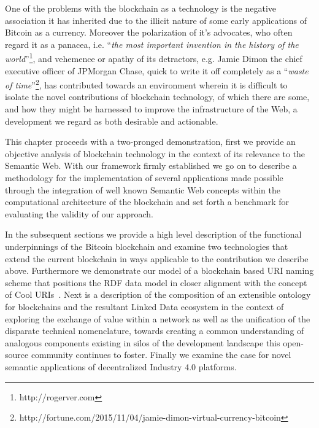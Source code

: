 One of the problems with the blockchain as a technology is the negative association it has inherited due to the illicit nature of some early applications of Bitcoin as a currency. Moreover the polarization of it's advocates, who often regard it as a panacea, i.e. ``\textit{the most important invention in the history of the world}''\footnote{\footnotesize{http://rogerver.com}}, and vehemence or apathy of its detractors, e.g. Jamie Dimon the chief executive officer of JPMorgan Chase, quick to write it off completely as a ``\textit{waste of time}''\footnote{\footnotesize{http://fortune.com/2015/11/04/jamie-dimon-virtual-currency-bitcoin}}, has contributed towards an environment wherein it is difficult to isolate the novel contributions of blockchain technology, of which there are some, and how they might be harnessed to improve the infrastructure of the Web, a development we regard as both desirable and actionable. 

This chapter proceeds with a two-pronged demonstration, first we provide an objective analysis of blockchain technology in the context of its relevance to the Semantic Web.
With our framework firmly established we go on to describe a methodology for the implementation of several applications made possible through the integration of well known Semantic Web concepts within the computational architecture of the blockchain and set forth a benchmark for evaluating the validity of our approach.

In the subsequent sections we provide a high level description of the functional underpinnings of the Bitcoin blockchain and examine two technologies that extend the current blockchain in ways applicable to the contribution we describe above. 
Furthermore we demonstrate our model of a blockchain based URI naming scheme that positions the RDF data model in closer alignment with the concept of Cool URIs~\cite{timbernerslee1998}. 
Next is a description of the composition of an extensible ontology for blockchains and the resultant Linked Data ecosystem in the context of exploring the exchange of value within a network as well as the unification of the disparate technical nomenclature, towards creating a common understanding of analogous components existing in silos of the development landscape this open-source community continues to foster.
Finally we examine the case for novel semantic applications of decentralized Industry 4.0 platforms. 



